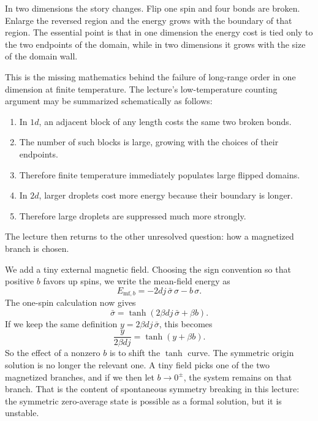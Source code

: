 In two dimensions the story changes. Flip one spin and four bonds are broken. Enlarge the reversed region and the energy grows with the boundary of that region. The essential point is that in one dimension the energy cost is tied only to the two endpoints of the domain, while in two dimensions it grows with the size of the domain wall.

This is the missing mathematics behind the failure of long-range order in one dimension at finite temperature. The lecture's low-temperature counting argument may be summarized schematically as follows:
\begin{enumerate}
\item In \(1d\), an adjacent block of any length costs the same two broken bonds.
\item The number of such blocks is large, growing with the choices of their endpoints.
\item Therefore finite temperature immediately populates large flipped domains.
\item In \(2d\), larger droplets cost more energy because their boundary is longer.
\item Therefore large droplets are suppressed much more strongly.
\end{enumerate}

The lecture then returns to the other unresolved question: how a magnetized branch is chosen.

We add a tiny external magnetic field. Choosing the sign convention so that positive \(b\) favors up spins, we write the mean-field energy as
\begin{equation}
E_{\text{mf},b}=-2dj\,\bar{\sigma}\,\sigma-b\,\sigma.
\end{equation}
The one-spin calculation now gives
\begin{equation}
\bar{\sigma}=\tanh(2\beta d j\,\bar{\sigma}+\beta b).
\end{equation}
If we keep the same definition \(y=2\beta d j\,\bar{\sigma}\), this becomes
\begin{equation}
\frac{y}{2\beta d j}=\tanh(y+\beta b).
\end{equation}
So the effect of a nonzero \(b\) is to shift the \(\tanh\) curve. The symmetric origin solution is no longer the relevant one. A tiny field picks one of the two magnetized branches, and if we then let \(b\to0^\pm\), the system remains on that branch. That is the content of spontaneous symmetry breaking in this lecture: the symmetric zero-average state is possible as a formal solution, but it is unstable.

